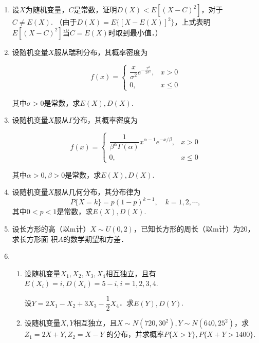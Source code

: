 \documentclass[10pt,a4paper]{article}
\begin{document}
\begin{enumerate}
    \item 设$X$为随机变量，$C$是常数，证明$D(X)<E[(X-C)^2]$，对于$C\neq E(X)$.
    （由于$D(X)=E\{[X-E(X)]^2\}$，上式表明$E[(X-C)^2]$当$C=E(X)$时取到最小值．）


    \item 设随机变量$X$服从瑞利分布，其概率密度为
    \vspace{-0.5cm}
    \begin{spacing}{2.0}
    $$f(x)=\left\{\begin{array}{ll}
        \dfrac{x}{\sigma^2}e^{-\frac{x^{\scriptscriptstyle 2}}{2\sigma^{\scriptscriptstyle 2}}}, & x>0\\
        0, & x\leq 0
    \end{array}\right.$$
    \end{spacing}
    \vspace{-0.5cm}
    其中$\sigma>0$是常数，求$E(X),D(X)$.


    \item 设随机变量$X$服从$\Gamma$分布，其概率密度为
    \vspace{-0.5cm}
    \begin{spacing}{2.0}
    $$f(x)=\left\{\begin{array}{ll}
        \dfrac{1}{\beta^\alpha \Gamma(\alpha)}x^{\alpha-1}e^{-x/\beta}, & x>0\\
        0, & x\leq 0
    \end{array}\right.$$
    \end{spacing}
    \vspace{-0.5cm}
    其中$\alpha>0,\beta>0$是常数，求$E(X),D(X)$.



    \item 设随机变量$X$服从几何分布，其分布律为
    $$P\{X=k\}=p(1-p)^{k-1},\quad k=1,2,\cdots,$$
    其中$0<p<1$是常数，求$E(X),D(X)$.



    \item 设长方形的高（以m计）$X\sim U(0,2)$，已知长方形的周长（以m计）为20，求长方形面
    积$A$的数学期望和方差．


    \item \begin{enumerate}
        \item 设随机变量$X_1,X_2,X_3,X_4$相互独立，且有$E(X_i)=i,D(X_i)=5-i,i=1,2,3,4$.
        \vspace{-0.2cm}
        \begin{spacing}{2.0}
        设$Y=2X_1-X_2+3X_3-\dfrac{1}{2}X_4$．求$E(Y),D(Y)$.
        \end{spacing}
        \vspace{-0.2cm}
    \item 设随机变量$X,Y$相互独立，且$X\sim N(720,30^2),Y\sim N(640,25^2)$，求$Z_1=2X+Y,Z_2=X-Y$
    的分布，并求概率$P\{X>Y\},P\{X+Y>1400\}$.
    \end{enumerate}




\end{enumerate}
\end{document}

